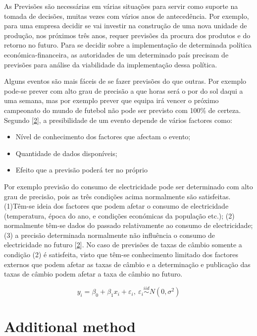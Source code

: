 \documentclass[
  openany]{book}
\providecommand{\tightlist}{%
  \setlength{\itemsep}{0pt}\setlength{\parskip}{0pt}}
\begin{document}
As Previsões são necessárias em várias situações para servir como suporte na tomada de decisões, muitas vezes com vários anos de antecedência. Por exemplo, para uma empresa decidir se vai investir na construção de uma nova unidade de produção, nos próximos três anos, requer previsões da procura dos produtos e do retorno no futuro. Para se decidir sobre a implementação de determinada política económica-financeira, as autoridades de um determinado país precisam de previsões para análise da viabilidade da implementação dessa política.

Alguns eventos são mais fáceis de se fazer previsões do que outras. Por exemplo pode-se prever com alto grau de precisão a que horas será o por do sol daqui a uma semana, mas por exemplo prever que equipa irá vencer o próximo campeonato do mundo de futebol não pode ser previsto com 100\% de certeza. Segundo {[}\protect\hyperlink{ref-hyndman2018forecasting}{2}{]}, a presibilidade de um evento depende de vários factores como:

\begin{itemize}
\tightlist
\item
  Nível de conhecimento dos factores que afectam o evento;
\item
  Quantidade de dados disponíveis;
\item
  Efeito que a previsão poderá ter no próprio
\end{itemize}

Por exemplo previsão do consumo de electricidade pode ser determinado com alto grau de precisão, pois as três condições acima normalmente são satisfeitas. (1)Têm-se ideia dos factores que podem afetar o consumo de electricidade (temperatura, época do ano, e condições económicas da população etc.); (2) normalmente têm-se dados do passado relativamente ao consumo de electricidade; (3) a precisão determinada normalmente não influência o consumo de electricidade no futuro {[}\protect\hyperlink{ref-hyndman2018forecasting}{2}{]}. No caso de previsões de taxas de câmbio somente a condição (2) é satisfeita, visto que têm-se conhecimento limitado dos factores externos que podem afetar as taxas de câmbio e a determinação e publicação das taxas de câmbio podem afetar a taxa de câmbio no futuro.

\begin{equation}
y_i = \beta_0 + \beta_1x_i + \varepsilon_i,\  \varepsilon_i \overset{iid}{\sim} N(0, \sigma^2)
\label{eq:linreg}
\end{equation}

\hypertarget{additional-method}{%
\section{Additional method}\label{additional-method}}
\end{document}
